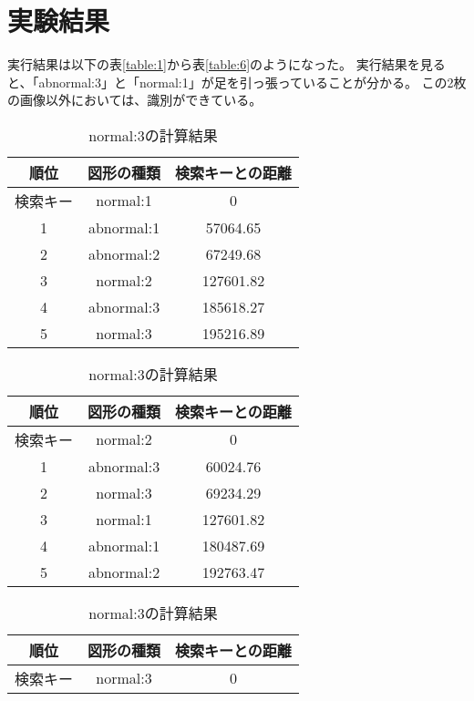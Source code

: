 \section{実験結果}
実行結果は以下の表\ref{table:1}から表\ref{table:6}のようになった。
実行結果を見ると、「abnormal:3」と「normal:1」が足を引っ張っていることが分かる。
この2枚の画像以外においては、識別ができている。
\begin{table}[hbtp]
  \begin{minipage}[t]{0.45\hsize}
    \centering
    \caption{normal:1の計算結果}
    \label{table:1}
    \begin{tabular}{|c|c|c|}
      \hline
      順位 & 図形の種類 & 検索キーとの距離\\
      \hline
      検索キー & normal:1 & 0 \\
      1 & abnormal:1 & 57064.65 \\
      2 & abnormal:2 & 67249.68 \\
      3 & normal:2 & 127601.82 \\
      4 & abnormal:3 & 185618.27 \\
      5 & normal:3 & 195216.89 \\
      \hline
    \end{tabular}
  \end{minipage}
  \begin{minipage}[t]{0.45\hsize}
  \centering
  \caption{normal:2の計算結果}
  \label{table:2}
    \begin{tabular}{|c|c|c|}
      \hline
      順位 & 図形の種類 & 検索キーとの距離\\
      \hline
      検索キー & normal:2 & 0 \\
      1 & abnormal:3 & 60024.76 \\
      2 & normal:3 & 69234.29 \\
      3 & normal:1 & 127601.82 \\
      4 & abnormal:1 & 180487.69 \\
      5 & abnormal:2 & 192763.47 \\
      \hline
    \end{tabular}
  \end{minipage}
  \begin{minipage}[t]{0.45\hsize}
  \centering
  \caption{normal:3の計算結果}
  \label{table:3}
    \begin{tabular}{|c|c|c|}
      \hline
      順位 & 図形の種類 & 検索キーとの距離\\
      \hline
      検索キー & normal:3 & 0 \\

\end{tabular}
\end{minipage}
\end{table}
